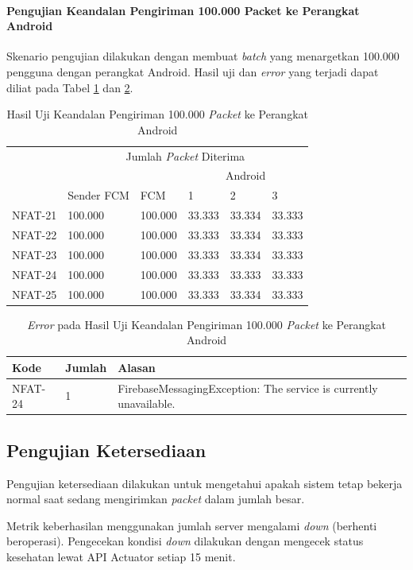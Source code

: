 \paragraph{Pengujian Keandalan Pengiriman 100.000 Packet ke Perangkat Android}
\par Skenario pengujian dilakukan dengan membuat \textit{batch} yang menargetkan 100.000 pengguna dengan perangkat Android. Hasil uji dan \textit{error} yang terjadi dapat diliat pada Tabel \ref{t:keandalan-android-100k} dan \ref{t:error-keandalan-android-100k}.
\begin{longtable}{|p{1.5cm}|p{2cm}|p{1.5cm}|p{1cm}|p{1cm}|p{1cm}|}
	\caption{Hasil Uji Keandalan Pengiriman 100.000 \textit{Packet} ke Perangkat Android} \label{t:keandalan-android-100k} \\ \hline
	\rowcolor{lightgray} & \multicolumn{5}{c|}{Jumlah \textit{Packet} Diterima} \\ \hhline{~|*5{-}|}
	\rowcolor{lightgray} & & & \multicolumn{3}{c|}{Android} \\ \hhline{~~~|*3{-}|}
	\rowcolor{lightgray} \multirow{-3}{*}{Kode} & \multirow{-2}{*}{Sender FCM} & \multirow{-2}{*}{FCM} & 1 & 2 & 3 \\ \hline
	NFAT-21 & 100.000 & 100.000 & 33.333 & 33.334 & 33.333 \\ \hline
	NFAT-22 & 100.000 & 100.000 & 33.333 & 33.334 & 33.333 \\ \hline
	NFAT-23 & 100.000 & 100.000 & 33.333 & 33.334 & 33.333 \\ \hline
	NFAT-24 & 100.000 & 100.000 & 33.333 & 33.333 & 33.333 \\ \hline
	NFAT-25 & 100.000 & 100.000 & 33.333 & 33.334 & 33.333 \\ \hline
\end{longtable}
\begin{longtable}{|p{1.5cm}|p{1.5cm}|p{5cm}|}
	\caption{\textit{Error} pada Hasil Uji Keandalan Pengiriman 100.000 \textit{Packet} ke Perangkat Android} \label{t:error-keandalan-android-100k} \\ \hline
	\rowcolor{lightgray} Kode & Jumlah & Alasan \\ \hline
	NFAT-24 & 1 & FirebaseMessagingException: The service is currently unavailable. \\ \hline
\end{longtable}

\subsection{Pengujian Ketersediaan}
\par Pengujian ketersediaan dilakukan untuk mengetahui apakah sistem tetap bekerja normal saat sedang mengirimkan \textit{packet} dalam jumlah besar.
\par Metrik keberhasilan menggunakan jumlah server mengalami \textit{down} (berhenti beroperasi). Pengecekan kondisi \textit{down} dilakukan dengan mengecek status kesehatan lewat API Actuator setiap 15 menit.

